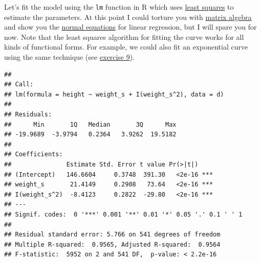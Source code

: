 \documentclass[
]{book}
\newenvironment{Shaded}{\begin{snugshade}}{\end{snugshade}}
\newcommand{\AttributeTok}[1]{\textcolor[rgb]{0.13,0.29,0.53}{#1}}
\newcommand{\CommentTok}[1]{\textcolor[rgb]{0.56,0.35,0.01}{\textit{#1}}}
\newcommand{\DecValTok}[1]{\textcolor[rgb]{0.00,0.00,0.81}{#1}}
\newcommand{\FloatTok}[1]{\textcolor[rgb]{0.00,0.00,0.81}{#1}}
\newcommand{\FunctionTok}[1]{\textcolor[rgb]{0.13,0.29,0.53}{\textbf{#1}}}
\newcommand{\NormalTok}[1]{#1}
\newcommand{\OtherTok}[1]{\textcolor[rgb]{0.56,0.35,0.01}{#1}}
\newcommand{\SpecialCharTok}[1]{\textcolor[rgb]{0.81,0.36,0.00}{\textbf{#1}}}
\begin{document}
Let's fit the model using the \texttt{lm} function in R which uses
\href{https://en.wikipedia.org/wiki/Least_squares}{least squares} to estimate the parameters.
At this point I could torture you with \href{https://en.wikipedia.org/wiki/Matrix_(mathematics)}{matrix algebra}
and show you the \href{https://en.wikipedia.org/wiki/Linear_least_squares}{normal equations} for linear regression,
but I will spare you for now.
Note that the least squares algorithm for fitting the curve works for all
kinds of functional forms. For example, we could also fit an exponential curve using the same
technique (see \hyperref[exercise9_multiple_regression]{exercise 9}).

\begin{Shaded}
\end{Shaded}

\begin{verbatim}
## 
## Call:
## lm(formula = height ~ weight_s + I(weight_s^2), data = d)
## 
## Residuals:
##      Min       1Q   Median       3Q      Max 
## -19.9689  -3.9794   0.2364   3.9262  19.5182 
## 
## Coefficients:
##               Estimate Std. Error t value Pr(>|t|)    
## (Intercept)   146.6604     0.3748  391.30   <2e-16 ***
## weight_s       21.4149     0.2908   73.64   <2e-16 ***
## I(weight_s^2)  -8.4123     0.2822  -29.80   <2e-16 ***
## ---
## Signif. codes:  0 '***' 0.001 '**' 0.01 '*' 0.05 '.' 0.1 ' ' 1
## 
## Residual standard error: 5.766 on 541 degrees of freedom
## Multiple R-squared:  0.9565, Adjusted R-squared:  0.9564 
## F-statistic:  5952 on 2 and 541 DF,  p-value: < 2.2e-16
\end{verbatim}

\begin{Shaded}
\end{Shaded}
\end{document}
